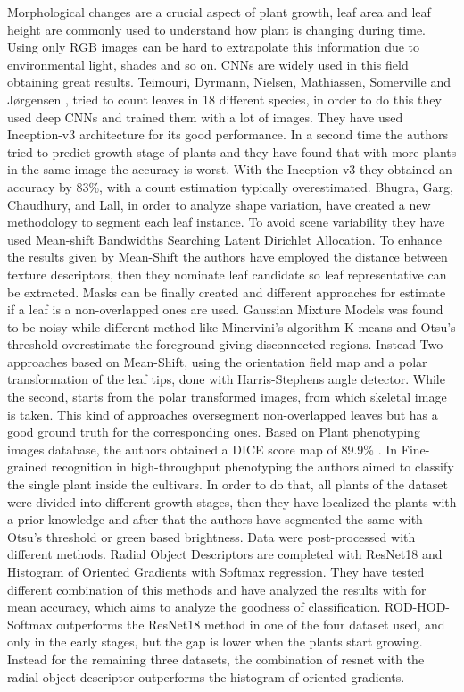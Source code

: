 \documentclass[runningheads]{llncs}
\begin{document}
Morphological changes are a crucial aspect of plant growth, leaf area and leaf height are commonly used to understand how plant is changing during time.
Using only RGB images can be hard to extrapolate this information due to environmental light, shades and so on. CNNs are widely used in this field obtaining
great results. Teimouri, Dyrmann, Nielsen, Mathiassen, Somerville and Jørgensen \cite{weedestimator}, tried to count leaves in 18 different species, in order to
do this they used deep CNNs and trained them with a lot of images. They have used Inception-v3 \cite{inceptionv3} architecture for its good performance.
In a second time the authors tried to predict growth stage of plants and they have found that with more plants in the same image the accuracy is worst. With the
Inception-v3 they obtained an accuracy by 83\%, with a count estimation typically overestimated.
Bhugra, Garg, Chaudhury, and Lall, in order to analyze shape variation, have created a new methodology to segment each leaf instance. To avoid scene variability
they have used Mean-shift \cite{meanshift} Bandwidths Searching Latent Dirichlet Allocation. To enhance the results given by Mean-Shift the authors have employed the
distance between texture descriptors, then they nominate leaf candidate so leaf representative can be extracted. Masks can be finally created and different approaches
for estimate if a leaf is a non-overlapped ones are used. Gaussian Mixture Models was found to be noisy while different method like Minervini's algorithm K-means and
Otsu's threshold overestimate the foreground giving disconnected regions. Instead Two approaches based on Mean-Shift, using the orientation field map and a
polar transformation of the leaf tips, done with Harris-Stephens angle detector. While the second, starts from the polar transformed images, from which skeletal image
is taken. This kind of approaches oversegment non-overlapped leaves but has a good ground truth for the corresponding ones. Based on Plant phenotyping images database,
the authors obtained a DICE score map of 89.9\% \cite{DICE}.
In Fine-grained recognition in high-throughput phenotyping \cite{FGrecognition} the authors aimed to classify the single plant inside the cultivars. In order to do that,
all plants of the dataset were divided into different growth stages, then they have localized the plants with a prior knowledge and after that the authors have segmented the
same with Otsu's threshold or green based brightness. Data were post-processed with different methods. Radial Object Descriptors are completed
with ResNet18 \cite{ResNet18} and Histogram of Oriented Gradients with Softmax regression. They have tested different combination of this methods and have analyzed
the results with for mean accuracy, which aims to analyze the goodness of classification. ROD-HOD-Softmax outperforms the ResNet18 method in one of the four dataset
used, and only in the early stages, but the gap is lower when the plants start growing. Instead for the remaining three datasets, the combination of resnet with
the radial object descriptor outperforms the histogram of oriented gradients.
\end{document}

